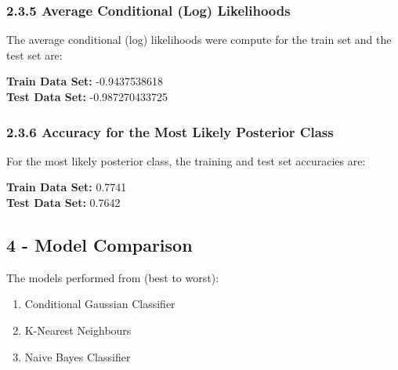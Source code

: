 \documentclass[10pt]{article}
\begin{document}
\subsubsection{2.3.5 Average Conditional (Log) Likelihoods}

The average conditional (log) likelihoods were compute for the train set and the test set are:
\begin{center}
\textbf{Train Data Set: } -0.9437538618
\\
\textbf{Test Data Set: } -0.987270433725
\end{center}

\subsubsection{2.3.6 Accuracy for the Most Likely Posterior Class}

For the most likely posterior class, the training and test set accuracies are: 
\begin{center}
\textbf{Train Data Set: } 0.7741
\\
\textbf{Test Data Set: } 0.7642
\end{center}



\subsection{4 -  Model Comparison}

The models performed from (best to worst): 
\begin{enumerate}
\item Conditional Gaussian Classifier
\item K-Nearest Neighbours
\item Naive Bayes Classifier
\end{enumerate}
\end{document}
